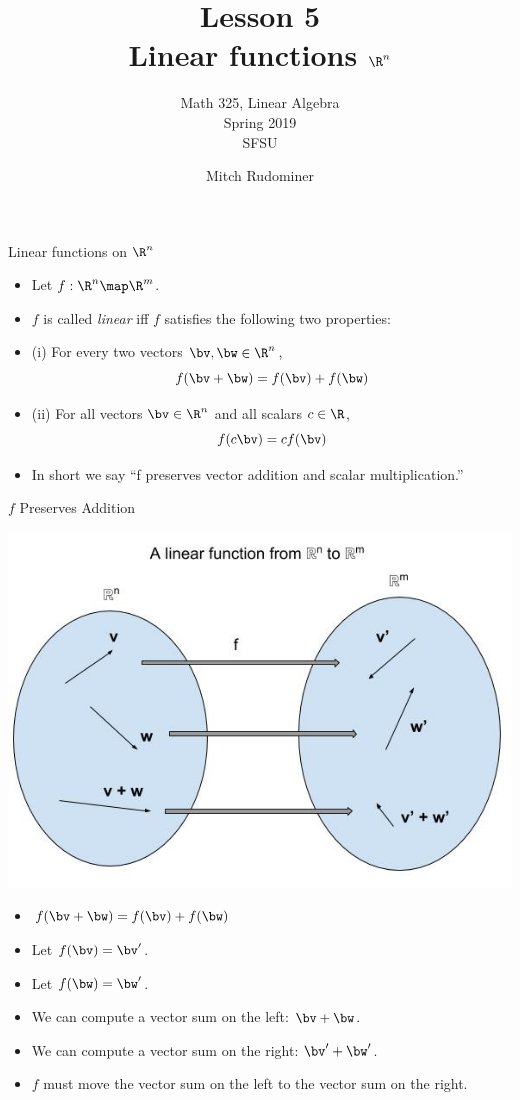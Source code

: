 \documentclass{beamer}
\title{Lesson 5 \\ Linear functions $\R^n$}
\subtitle{Math 325, Linear Algebra \\ Spring 2019 \\ SFSU}
\author{Mitch Rudominer}
\date{}
\begin{document}
\begin{frame}
  \titlepage
\end{frame}

\begin{frame}{Linear functions on $\R^n$}

\begin{itemize}
\item Let $f:\R^n \map \R^m$.
\item $f$ is called \emph{linear} iff $f$ satisfies the following two properties:
\item (i) For every two vectors $\bv, \bw \in\R^n$, $$f(\bv + \bw) = f(\bv) + f(\bw)$$
\item (ii) For all vectors $\bv\in\R^n$ and all scalars $c\in \R$,
$$f(c \bv) = c f(\bv)$$
\item In short we say ``f preserves vector addition and scalar multiplication.''
\end{itemize}

\end{frame}

\begin{frame}{$f$ Preserves Addition}

\begin{center}
\includegraphics[scale=0.25]{preserving-addition}
\end{center}

\begin{itemize}
\item $f(\bv + \bw) = f(\bv) + f(\bw)$
\item Let $f(\bv) = \bv^{\prime}$.
\item Let $f(\bw) = \bw^{\prime}$.
\item We can compute a vector sum on the left: $\bv + \bw$.
\item We can compute a vector sum on the right: $\bv^{\prime} + \bw^{\prime}$.
\item $f$ must move the vector sum on the left to the vector sum on the right.
\end{itemize}

\end{frame}
\end{document}
